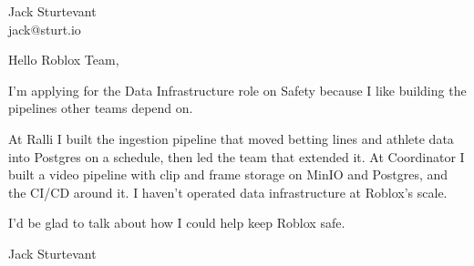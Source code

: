 \documentclass[11pt]{article}
\begin{document}
\raggedright

{\namefont\fontsize{20pt}{24pt}\selectfont Jack Sturtevant}\\[-0.3em]
jack@sturt.io

\vspace{1.2em}

Hello Roblox Team,

I'm applying for the Data Infrastructure role on Safety because I like building the pipelines other teams depend on.

At Ralli I built the ingestion pipeline that moved betting lines and athlete data into Postgres on a schedule, then led the team that extended it. At Coordinator I built a video pipeline with clip and frame storage on MinIO and Postgres, and the CI/CD around it. I haven't operated data infrastructure at Roblox's scale.

I'd be glad to talk about how I could help keep Roblox safe.

\vspace{0.6em}
Jack Sturtevant
\end{document}
